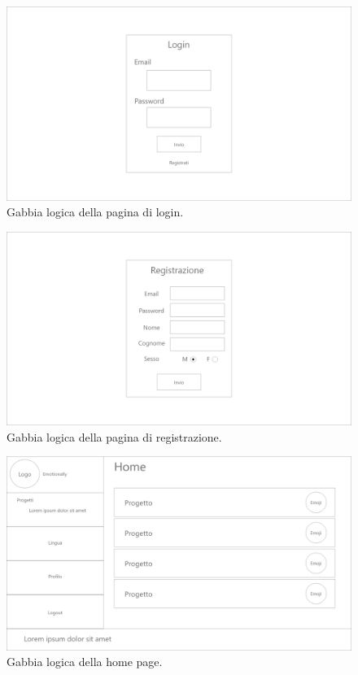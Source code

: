 \begin{figure}[H]
	\centering
	\caption{Gabbia logica della pagina di login.}
	\label{fig:gabbie-logiche:login}
	\includegraphics[width=\textwidth]{images/gabbie-logiche/Login}
\end{figure}
\begin{figure}[H]
	\centering

	\caption{Gabbia logica della pagina di registrazione.}
	\label{fig:gabbie-logiche:registrazione}
	\includegraphics[width=\textwidth]{images/gabbie-logiche/Registrazione}
\end{figure}

\begin{figure}[H]
	\centering
	\caption{Gabbia logica della home page.}
	\label{fig:gabbie-logiche:home-page}
	\includegraphics[width=\textwidth]{images/gabbie-logiche/Home}
\end{figure}

